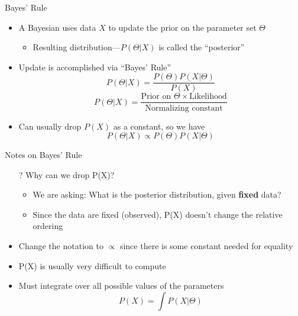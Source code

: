 \documentclass[aspectratio=169]{beamer}
\begin{document}
\begin{frame}{Bayes' Rule}

\begin{itemize}
	\item A Bayesian uses data $X$ to update the prior on the parameter set $\Theta$
	\begin{itemize}
		\item Resulting distribution---$P(\Theta|X)$ is called the ``posterior''
	\end{itemize}
	\item Update is accomplished via ``Bayes' Rule''
	$$P(\Theta | X) = \frac{P(\Theta) P(X | \Theta)}{P(X)}$$
	$$P(\Theta | X) =  \frac{\textrm{Prior on\ }\Theta \times \textrm{Likelihood}}{\textrm{Normalizing constant}} $$
	\item Can usually drop $P(X)$ as a constant, so we have
	$$P(\Theta | X) \propto P(\Theta) P(X | \Theta)$$
\end{itemize}
\end{frame}

\begin{frame}{Notes on Bayes' Rule}

\begin{itemize}
	\item[?] Why can we drop P(X)?
	\begin{itemize}
		\item We are asking: What is the posterior distribution, given \textbf{fixed} data?
		\item Since the data are fixed (observed), P(X) doesn't change the relative ordering
	\end{itemize}
	\item Change the notation to $\propto$ since there is some constant needed for equality
	\item P(X) is usually very difficult to compute
	\item Must integrate over all possible values of the parameters
	$$P(X) = \int P(X|\Theta)$$
\end{itemize}
\end{frame}
\end{document}
